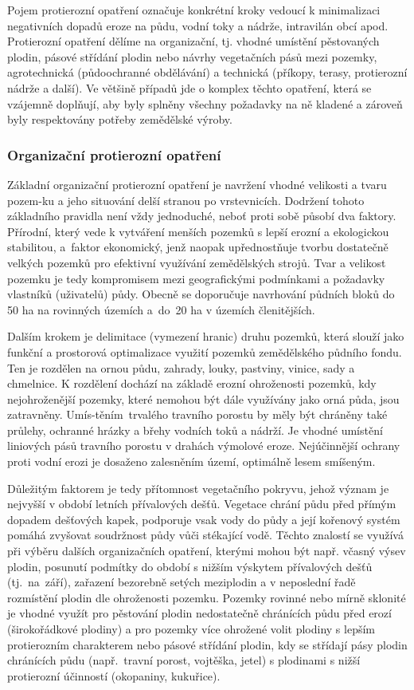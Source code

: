 Pojem protierozní opatření označuje konkrétní kroky vedoucí k
minimalizaci nega\-tivních dopadů eroze na půdu, vodní toky a nádrže,
intravilán obcí apod. Protierozní opatření dělíme na organizační,
tj. vhodné umístění pěstovaných plodin, pásové střídání plodin nebo
návrhy vegetačních pásů mezi pozemky, agrotechnická (půdoochranné
obdělávání) a technická (příkopy, terasy, protierozní nádrže a
další). Ve většině případů jde o komplex těchto opatření, která se
vzájemně doplňují, aby byly splněny všechny požadavky na ně kladené a
zároveň byly respektovány potřeby zemědělské
výroby.\cite{Holy1994}\cite{janecek2012}

\subsubsection{Organizační protierozní opatření}
Základní organizační protierozní opatření je navržení vhodné velikosti
a tvaru pozem-ku a jeho situování delší stranou po
vrstevnicích. Dodržení tohoto základního pravidla není vždy
jednoduché, neboť proti sobě působí dva faktory. Přírodní, který vede
k vytváření menších pozemků s lepší erozní a ekologickou stabilitou,
a~faktor ekonomický, jenž naopak upřednostňuje tvorbu dostatečně
velkých pozemků pro efektivní využívání zemědělských strojů. Tvar a
velikost pozemku je tedy kompromisem mezi geografickými podmínkami a
požadavky vlastníků (uživatelů) půdy. Obecně se doporučuje navrhování
půdních bloků do 50 ha na rovinných územích a~do~20 ha v územích
členitějších.

Dalším krokem je delimitace (vymezení hranic) druhu pozemků, která
slouží jako funkční a prostorová optimalizace využití pozemků
zemědělského půdního fondu. Ten je rozdělen na ornou půdu, zahrady,
louky, pastviny, vinice, sady a chmelnice. K rozdělení dochází na
základě erozní ohroženosti pozemků, kdy nejohroženější pozemky, které
nemohou být dále využívány jako orná půda, jsou
zatravněny. Umís-těním~trvalého travního porostu by měly být chráněny
také průlehy, ochranné hrázky a břehy vodních toků a nádrží. Je vhodné
umístění liniových pásů travního porostu v drahách výmolové
eroze. Nejúčinnější ochrany proti vodní erozi je dosaženo zalesněním
území, optimálně lesem smíšeným.

Důležitým faktorem je tedy přítomnost vegetačního pokryvu, jehož
význam je nejvyšší v období letních přívalových dešťů. Vegetace chrání
půdu před přímým dopadem dešťových kapek, podporuje vsak vody do půdy
a její kořenový systém pomáhá zvyšovat soudržnost půdy vůči stékající
vodě. Těchto znalostí se využívá při výběru dalších organizačních
opatření, kterými mohou být např. včasný výsev plodin, posunutí
podmítky do období s nižším výskytem přívalových dešťů (tj.~na~září),
zařazení bezorebně setých meziplodin a v neposlední řadě rozmístění
plodin dle ohroženosti pozemku. Pozemky rovinné nebo mírně
sklonité je vhodné využít pro pěstování plodin nedostatečně chránících
půdu před erozí (širokořádkové plodiny) a pro pozemky více ohrožené
volit plodiny s lepším protierozním charakterem nebo pásové střídání
plodin, kdy se střídají pásy plodin chránících půdu (např.~travní
porost, vojtěška, jetel) s plodinami s nižší protierozní účinností
(okopaniny, kukuřice).\cite{janecek2012}

